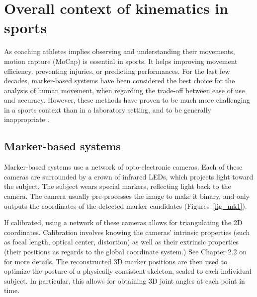 \minitoc
\newpage



\section{Overall context of kinematics in sports}

As coaching athletes implies observing and understanding their movements, motion capture (MoCap) is essential in sports. It helps improving movement efficiency, preventing injuries, or predicting performances. For the last few decades, marker-based systems have been considered the best choice for the analysis of human movement, when regarding the trade-off between ease of use and accuracy. However, these methods have proven to be much more challenging in a sports context than in a laboratory setting, and to be generally inappropriate \cite{Mündermann2006}.

\subsection{Marker-based systems}

Marker-based systems use a network of opto-electronic cameras. Each of these cameras are surrounded by a crown of infrared LEDs, which projects light toward the subject. The subject wears special markers, reflecting light back to the camera. The camera usually pre-processes the image to make it binary, and only outputs the coordinates of the detected marker candidates (Figures~\ref{fig_mk1}). 

If calibrated, using a network of these cameras allows for triangulating the 2D coordinates. Calibration involves knowing the cameras' intrinsic properties (such as focal length, optical center, distortion) as well as their extrinsic properties (their positions as regards to the global coordinate system.) See Chapter 2.2 on  for more details. The reconstructed 3D marker positions are then used to optimize the posture of a physically consistent skeleton, scaled to each individual subject. In particular, this allows for obtaining 3D joint angles at each point in time.

